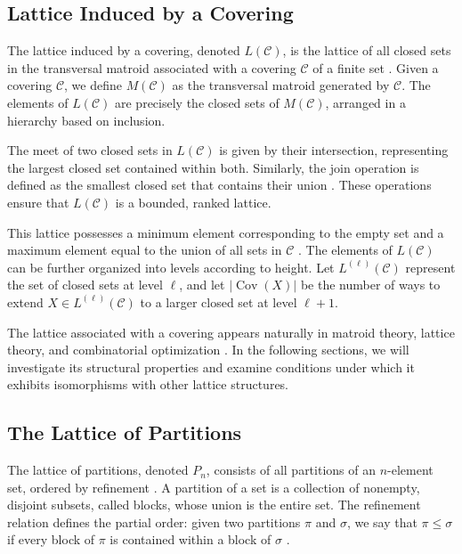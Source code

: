 \documentclass{article}
\begin{document}
\subsection{Lattice Induced by a Covering}

The lattice induced by a covering, denoted \( L(\mathcal{C}) \), is the lattice of all closed sets in the transversal matroid associated with a covering \( \mathcal{C} \) of a finite set \citep{Mirsky1971, Lovasz1978}. Given a covering \( \mathcal{C} \), we define \( M(\mathcal{C}) \) as the transversal matroid generated by \( \mathcal{C} \). The elements of \( L(\mathcal{C}) \) are precisely the closed sets of \( M(\mathcal{C}) \), arranged in a hierarchy based on inclusion.

The meet of two closed sets in $L(\mathcal{C})$ is given by their intersection, representing the largest closed set contained within both. Similarly, the join operation is defined as the smallest closed set that contains their union \citep{Gratzer2011}. These operations ensure that \( L(\mathcal{C}) \) is a bounded, ranked lattice.

This lattice possesses a minimum element corresponding to the empty set and a maximum element equal to the union of all sets in \( \mathcal{C} \) \citep{Bjorner1992}. The elements of \( L(\mathcal{C}) \) can be further organized into levels according to height. Let \( L^{(\ell)}(\mathcal{C}) \) represent the set of closed sets at level \( \ell \), and let $|\operatorname{Cov}(X)|$ be the number of ways to extend  $X\in L^{(\ell)}(\mathcal{C})$ to a larger closed set at level $\ell+1$.

The lattice associated with a covering appears naturally in matroid theory, lattice theory, and combinatorial optimization \citep{Welsh1976}. In the following sections, we will investigate its structural properties and examine conditions under which it exhibits isomorphisms with other lattice structures.

\subsection{The Lattice of Partitions}

The lattice of partitions, denoted \( P_n \), consists of all partitions of an \( n \)-element set, ordered by refinement \citep{Stanley2012}. A partition of a set is a collection of nonempty, disjoint subsets, called blocks, whose union is the entire set. The refinement relation defines the partial order: given two partitions \( \pi \) and \( \sigma \), we say that \( \pi \leq \sigma \) if every block of \( \pi \) is contained within a block of \( \sigma \) \citep{Gratzer2011}.
\end{document}
